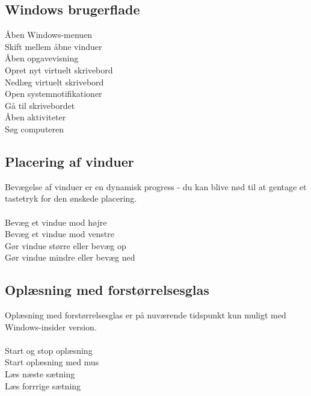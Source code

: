 \documentclass[a4paper, landscape, 11pt]{scrartcl}
\newcommand{\command}[2]{#1~\dotfill{}~#2\\} %
\begin{document}
\begin{multicols}{2}
\subsection*{Windows brugerflade}
\command{Åben Windows-menuen}{\keys{\faWindows}}
\command{Skift mellem åbne vinduer}{\keys{\Alt + \tab}}
\command{Åben opgavevisning}{\keys{\faWindows + \tab}}
\command{Opret nyt virtuelt skrivebord}{\keys{\faWindows + \ctrl + d}}
\command{Nedlæg virtuelt skrivebord}{\keys{\faWindows + \ctrl + F4}}
\command{Open systemnotifikationer}{}
\command{Gå til skrivebordet}{}
\command{Åben aktiviteter}{}
\command{Søg computeren}{}

\subsection*{Placering af vinduer}
Bevægelse af vinduer er en dynamisk progress - du kan blive nød til at gentage et tastetryk for den ønskede placering. \\ \\
\command{Bevæg et vindue mod højre}{\keys{\faWindows + \faArrowRight}}
\command{Bevæg et vindue mod venstre}{\keys{\faWindows + \faArrowLeft}}
\command{Gør vindue større eller bevæg op}{\keys{\faWindows + \faArrowUp}}
\command{Gør vindue mindre eller bevæg ned}{\keys{\faWindows + \faArrowDown}}

\subsection*{Oplæsning med forstørrelsesglas}
Oplæsning med forstørrelsesglas er på nuværende tidspunkt kun muligt med Windows-insider version. \\ \\
\command{Start og stop oplæsning}{\keys{\ctrl + \Alt + \enter}}
\command{Start oplæsning med mus}{\keys{\ctrl + \Alt + venstre-klik}}
\command{Læs næste sætning}{}
\command{Læs forrrige sætning}{}
\end{multicols}

\hrulefill{}
\end{document}
